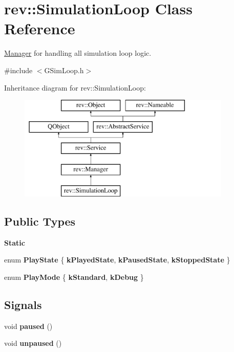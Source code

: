 \hypertarget{classrev_1_1_simulation_loop}{}\section{rev\+::Simulation\+Loop Class Reference}
\label{classrev_1_1_simulation_loop}


\mbox{\hyperlink{classrev_1_1_manager}{Manager}} for handling all simulation loop logic.  




{\ttfamily \#include $<$G\+Sim\+Loop.\+h$>$}

Inheritance diagram for rev\+::Simulation\+Loop\+:\begin{figure}[H]
\begin{center}
\leavevmode
\includegraphics[height=5.000000cm]{classrev_1_1_simulation_loop}
\end{center}
\end{figure}
\subsection*{Public Types}
\begin{Indent}\textbf{ Static}\par
\begin{DoxyCompactItemize}
\item 
\mbox{\label{classrev_1_1_simulation_loop_aa4fcaf3050437919d06c0cad0d68fe8c}} 
enum {\bfseries Play\+State} \{ {\bfseries k\+Played\+State}, 
{\bfseries k\+Paused\+State}, 
{\bfseries k\+Stopped\+State}
 \}
\item 
\mbox{\label{classrev_1_1_simulation_loop_a9e706e784a6b16b0ac5a949460dbce63}} 
enum {\bfseries Play\+Mode} \{ {\bfseries k\+Standard}, 
{\bfseries k\+Debug}
 \}
\end{DoxyCompactItemize}
\end{Indent}
\subsection*{Signals}
\begin{DoxyCompactItemize}
\item 
\mbox{\label{classrev_1_1_simulation_loop_a426bd25731cfb03492314822a041fb34}} 
void {\bfseries paused} ()
\item 
\mbox{\label{classrev_1_1_simulation_loop_aea93a2f82d6cef4f367ef97abc7a875a}} 
void {\bfseries unpaused} ()
\end{DoxyCompactItemize}
